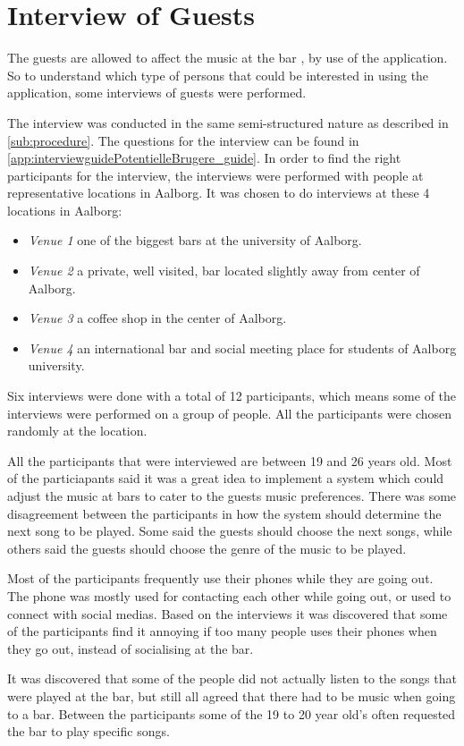 \section{Interview of Guests}
\label{userInterviews}

The guests are allowed to affect the music at the bar , by use of the application. So to understand which type of persons that could be interested in using the application, some interviews of guests were performed.

The interview was conducted in the same semi-structured nature as described in \cref{sub:procedure}. The questions for the interview can be found in \cref{app:interviewguidePotentielleBrugere_guide}. In order to find the right participants for the interview, the interviews were performed with people at representative locations in Aalborg. It was chosen to do interviews at these 4 locations in Aalborg:

\begin{itemize}
    \item \emph{Venue 1} one of the biggest bars at the university of Aalborg.
    \item \emph{Venue 2} a private, well visited, bar located slightly away from center of Aalborg.
    \item \emph{Venue 3} a coffee shop in the center of Aalborg.
    \item \emph{Venue 4} an international bar and social meeting place for students of Aalborg university.
\end{itemize}

Six interviews were done with a total of 12 participants, which means some of the interviews were performed on a group of people. All the participants were chosen randomly at the location.

All the participants that were interviewed are between 19 and 26 years old. Most of the particiapants said it was a great idea to implement a system which could adjust the music at bars to cater to the guests music preferences. There was some disagreement between the participants in how the system should determine the next song to be played. Some said the guests should choose the next songs, while others said the guests should choose the genre of the music to be played.

Most of the participants frequently use their phones while they are going out. The phone was mostly used for contacting each other while going out, or used to connect with social medias.
Based on the interviews it was discovered that some of the participants find it annoying if too many people uses their phones when they go out, instead of socialising at the bar.

It was discovered that some of the people did not actually listen to the songs that were played at the bar, but still all agreed that there had to be music when going to a bar. Between the participants some of the 19 to 20 year old's often requested the bar to play specific songs.
